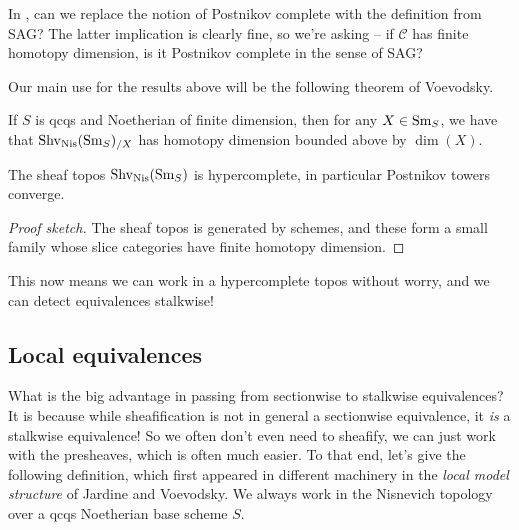 \documentclass[11pt,openany]{book}
\begin{document}
\begin{question} In , can we replace the notion of Postnikov complete with the definition from SAG? The latter implication is clearly fine, so we're asking -- if $\mathscr{C}$ has finite homotopy dimension, is it Postnikov complete in the sense of SAG?
\end{question}

Our main use for the results above will be the following theorem of Voevodsky.

\begin{theorem}
If $S$ is qcqs and Noetherian of finite dimension, then for any $X\in \mathrm{Sm}_S$, we have that $\mathrm{Shv}_{\mathrm{Nis}}(\mathrm{Sm}_S)_{/X}$ has homotopy dimension bounded above by $\dim(X)$.
\end{theorem}

\begin{corollary} The sheaf topos $\mathrm{Shv}_{\mathrm{Nis}}(\mathrm{Sm}_S)$ is hypercomplete, in particular Postnikov towers converge.
\end{corollary}
\begin{proof}[Proof sketch] The sheaf topos is generated by schemes, and these form a small family whose slice categories have finite homotopy dimension.
\end{proof}

This now means we can work in a hypercomplete topos without worry, and we can detect equivalences stalkwise!


\subsection{Local equivalences}

What is the big advantage in passing from sectionwise to stalkwise equivalences? It is because while sheafification is not in general a sectionwise equivalence, it \emph{is} a stalkwise equivalence! So we often don't even need to sheafify, we can just work with the presheaves, which is often much easier. To that end, let's give the following definition, which first appeared in different machinery in the \emph{local model structure} of Jardine and Voevodsky. We always work in the Nisnevich topology over a qcqs Noetherian base scheme $S$.
\end{document}
